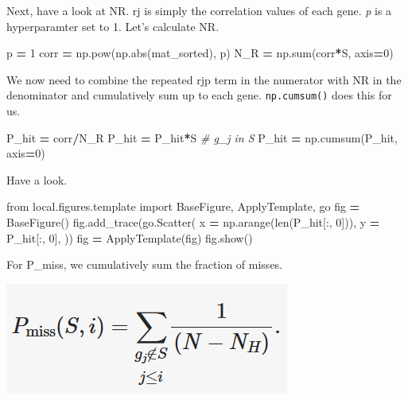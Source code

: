 \documentclass[
]{book}
\newenvironment{Shaded}{\begin{snugshade}}{\end{snugshade}}
\newcommand{\BuiltInTok}[1]{#1}
\newcommand{\CommentTok}[1]{\textcolor[rgb]{0.56,0.35,0.01}{\textit{#1}}}
\newcommand{\DecValTok}[1]{\textcolor[rgb]{0.00,0.00,0.81}{#1}}
\newcommand{\ImportTok}[1]{#1}
\newcommand{\NormalTok}[1]{#1}
\newcommand{\OperatorTok}[1]{\textcolor[rgb]{0.81,0.36,0.00}{\textbf{#1}}}
\begin{document}
Next, have a look at NR. rj is simply the correlation values of each gene. \emph{p} is a hyperparamter set to 1.
Let's calculate NR.

\begin{Shaded}
\begin{Highlighting}[numbers=left,,]
\NormalTok{p }\OperatorTok{=} \DecValTok{1}
\NormalTok{corr }\OperatorTok{=}\NormalTok{ np.}\BuiltInTok{pow}\NormalTok{(np.}\BuiltInTok{abs}\NormalTok{(mat\_sorted), p)}
\NormalTok{N\_R }\OperatorTok{=}\NormalTok{ np.}\BuiltInTok{sum}\NormalTok{(corr}\OperatorTok{*}\NormalTok{S, axis}\OperatorTok{=}\DecValTok{0}\NormalTok{)}
\end{Highlighting}
\end{Shaded}

We now need to combine the repeated \textbar rj\textbar{}p term in the numerator with
NR in the denominator and cumulatively sum up to each gene. \texttt{np.cumsum()} does this for us.

\begin{Shaded}
\begin{Highlighting}[numbers=left,,]
\NormalTok{P\_hit }\OperatorTok{=}\NormalTok{ corr}\OperatorTok{/}\NormalTok{N\_R}
\NormalTok{P\_hit }\OperatorTok{=}\NormalTok{ P\_hit}\OperatorTok{*}\NormalTok{S }\CommentTok{\# g\_j in S}
\NormalTok{P\_hit }\OperatorTok{=}\NormalTok{ np.cumsum(P\_hit, axis}\OperatorTok{=}\DecValTok{0}\NormalTok{)}
\end{Highlighting}
\end{Shaded}

Have a look.

\begin{Shaded}
\begin{Highlighting}[numbers=left,,]
\ImportTok{from}\NormalTok{ local.figures.template }\ImportTok{import}\NormalTok{ BaseFigure, ApplyTemplate, go}
\NormalTok{fig }\OperatorTok{=}\NormalTok{ BaseFigure()}
\NormalTok{fig.add\_trace(go.Scatter(}
\NormalTok{    x }\OperatorTok{=}\NormalTok{ np.arange(}\BuiltInTok{len}\NormalTok{(P\_hit[:, }\DecValTok{0}\NormalTok{])),}
\NormalTok{    y }\OperatorTok{=}\NormalTok{ P\_hit[:, }\DecValTok{0}\NormalTok{],}
\NormalTok{))}
\NormalTok{fig }\OperatorTok{=}\NormalTok{ ApplyTemplate(fig)}
\NormalTok{fig.show()}
\end{Highlighting}
\end{Shaded}

For P\_miss, we cumulatively sum the fraction of misses.

\includegraphics{img/lab4/gsea_pmiss.png}
\end{document}
